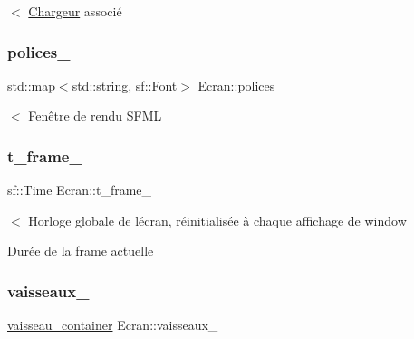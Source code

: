 $<$ \mbox{\hyperlink{class_chargeur}{Chargeur}} associé 

\mbox{\label{class_ecran_a180354db08d7f975536cc1cb05f18cb1}} 
\subsubsection{\texorpdfstring{polices\+\_\+}{polices\_}}
{\footnotesize\ttfamily std\+::map$<$std\+::string, sf\+::\+Font$>$ Ecran\+::polices\+\_\+\hspace{0.3cm}{\ttfamily [protected]}}



$<$ Fenêtre de rendu S\+F\+ML 

\mbox{\label{class_ecran_aefbd6654c88f1014dadbb04f27243cae}} 
\subsubsection{\texorpdfstring{t\+\_\+frame\+\_\+}{t\_frame\_}}
{\footnotesize\ttfamily sf\+::\+Time Ecran\+::t\+\_\+frame\+\_\+\hspace{0.3cm}{\ttfamily [protected]}}



$<$ Horloge globale de l\textquotesingle{}écran, réinitialisée à chaque affichage de window 

Durée de la frame actuelle \mbox{\label{class_ecran_a306123479f6a6b688ad13b5b4ca69de7}} 
\subsubsection{\texorpdfstring{vaisseaux\+\_\+}{vaisseaux\_}}
{\footnotesize\ttfamily \mbox{\hyperlink{def__type_8h_ad123ed7c93f42c8dd68e4af28b16b639}{vaisseau\+\_\+container}} Ecran\+::vaisseaux\+\_\+\hspace{0.3cm}{\ttfamily [protected]}}

\mbox{\label{class_ecran_a2c5cede2731636193a4a70048ab5fdbb}} 
